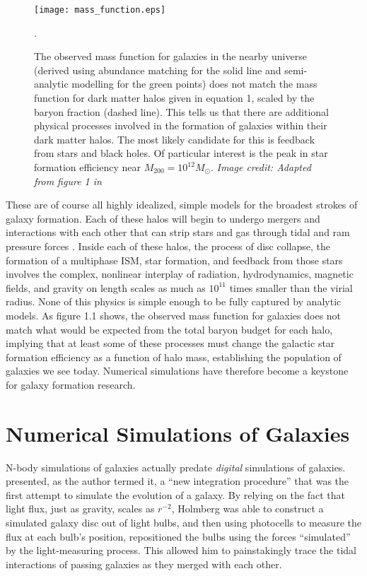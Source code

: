 \begin{figure}
    \texttt{[image: mass\_function.eps]}
    \caption[Galaxy mass function]{The observed mass function for galaxies in
    the nearby universe (derived using abundance matching for the solid line and
    semi-analytic modelling for the green points) does not match the mass
    function for dark matter halos given in equation 1, scaled by the baryon
    fraction (dashed line).  This tells us that there are additional physical
    processes involved in the formation of galaxies within their dark matter
    halos.  The most likely candidate for this is feedback from stars and black
    holes.  Of particular interest is the peak in star formation efficiency near
    $M_{200}=10^{12}M_\odot$.  \textit{Image credit: Adapted from figure 1 in
    \citet{Ferrero2012}}}.
\end{figure}

These are of course all highly idealized, simple models for the broadest strokes
of galaxy formation.  Each of these halos will begin to undergo mergers and
interactions \citep{Navarro1993,Kauffmann1999,Cole2000} with each other that can
strip stars and gas through tidal and ram pressure forces
\citep{Gunn1972,Dressler1980}.  Inside each of these halos, the process of disc
collapse, the formation of a multiphase ISM, star formation, and feedback from
those stars involves the complex, nonlinear interplay of radiation,
hydrodynamics, magnetic fields, and gravity on length scales as much as
$10^{11}$ times smaller than the virial radius.  None of this physics is simple
enough to be fully captured by analytic models. As figure 1.1 shows, the
observed mass function for galaxies does not match what would be expected from
the total baryon budget for each halo, implying that at least some of these
processes must change the galactic star formation efficiency as a function of
halo mass, establishing the population of galaxies we see today.  Numerical
simulations have therefore become a keystone for galaxy formation research.


\section{Numerical Simulations of Galaxies}
N-body simulations of galaxies actually predate {\it digital} simulations of
galaxies.  \citet{Holmberg1941} presented, as the author termed it, a ``new
integration procedure'' that was the first attempt to simulate the
evolution of a galaxy.  By relying on the fact that light flux, just as gravity,
scales as $r^{-2}$, Holmberg was able to construct a simulated galaxy disc out
of light bulbs, and then using photocells to measure the flux at each bulb's
position, repositioned the bulbs using the forces ``simulated'' by the
light-measuring process.  This allowed him to painstakingly trace the tidal
interactions of passing galaxies as they merged with each other.

